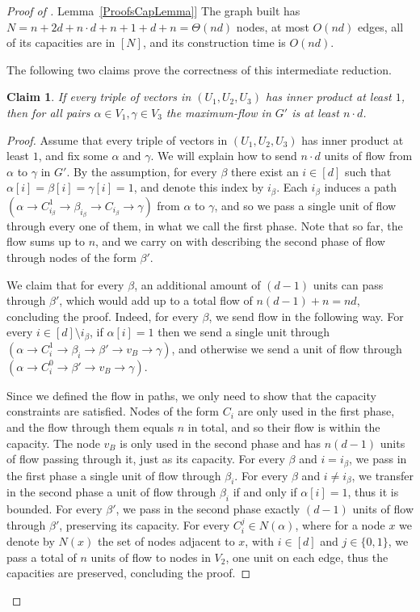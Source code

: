 \documentclass[11pt]{article}
\numberwithin{equation}{section}
\newtheorem{claim}[theorem]{Claim}
\theoremstyle{definition}
\theoremstyle{plain}
\newcommand{\expref}[2]{\hyperref[#2]{#1~\ref{#2}}}
\theoremstyle{plain}
\begin{document}
\begin{proof}[Proof of \expref{Lemma}{ProofsCapLemma}]
The graph built has $N=n+2d+n\cdot d+n+1+d+n=\Theta(nd)$ nodes, at most $O(nd)$ edges, all of its capacities are in $[N]$, and its construction time is $O(nd)$.

\medskip
The following two claims
prove the correctness of this intermediate reduction.

\begin{claim}\label{claim:simple}
If every triple of vectors in $(U_1, U_2, U_3)$ has inner product at least $1$, then for all pairs $\alpha \in V_1,\gamma \in V_3$ the maximum-flow in $G'$ is at least $n\cdot d$.
\end{claim}

\begin{proof}
Assume that every triple of vectors in $(U_1, U_2, U_3)$ has inner product at least $1$, and fix some $\alpha$ and $\gamma$.
We will explain how to send $n\cdot d$ units of flow from $\alpha$ to $\gamma$ in $G'$.
By the assumption, for every $\beta$ there exist an $i\in [d]$ such that $\alpha[i]=\beta[i]=\gamma[i]=1$, and denote this index by $i_{\beta}$.
Each $i_{\beta}$ induces a path $(\alpha\rightarrow C_{i_{\beta}}^1\rightarrow\beta_{i_{\beta}}\rightarrow C_{i_{\beta}}\rightarrow \gamma)$ from $\alpha$ to $\gamma$, and so we pass a single unit of flow through every one of them, in what we call the first phase. Note that so far, the flow sums up to $n$, and we carry on with describing the second phase of flow through nodes of the form $\beta'$.

We claim that for every $\beta$, an additional amount of $(d-1)$ units can pass through $\beta'$, which would add up to a total flow of $n(d-1)+n=nd$, concluding the proof. Indeed, for every $\beta$, we send flow in the following way. For every $i\in [d]\setminus i_{\beta}$, if $\alpha[i]=1$ then we send a single unit through $(\alpha\rightarrow C_i^1\rightarrow \beta_i\rightarrow \beta' \rightarrow  v_B\rightarrow \gamma)$, and otherwise we send a unit of flow through $(\alpha\rightarrow C_i^0\rightarrow \beta'\rightarrow v_B\rightarrow \gamma)$.

Since we defined the flow in paths, we only need to show that the capacity constraints are satisfied. Nodes of the form $C_i$ are only used in the first phase, and the flow through them equals $n$ in total, and so their flow is within the capacity. The node $v_B$ is only used in the second phase and has $n(d-1)$ units of flow passing through it, just as its capacity.
For every $\beta$ and $i=i_{\beta}$, we pass in the first phase a single unit of flow through $\beta_i$. For every $\beta$ and $i\neq i_{\beta}$, we transfer in the second phase a unit of flow through $\beta_i$ if and only if $\alpha[i]=1$, thus it is bounded. For every $\beta'$, we pass in the second phase exactly $(d-1)$ units of flow through $\beta'$, preserving its capacity. For every $C_i^j\in N(\alpha)$,
where for a node $x$ we denote by $N(x)$ the set of nodes adjacent to $x$,
with $i\in [d]$ and $j\in \{0,1\}$, we pass a total of $n$ units of flow to nodes in $V_2$, one unit on each edge, thus the capacities are preserved, concluding the proof.
\end{proof}


\end{proof}
\end{document}
